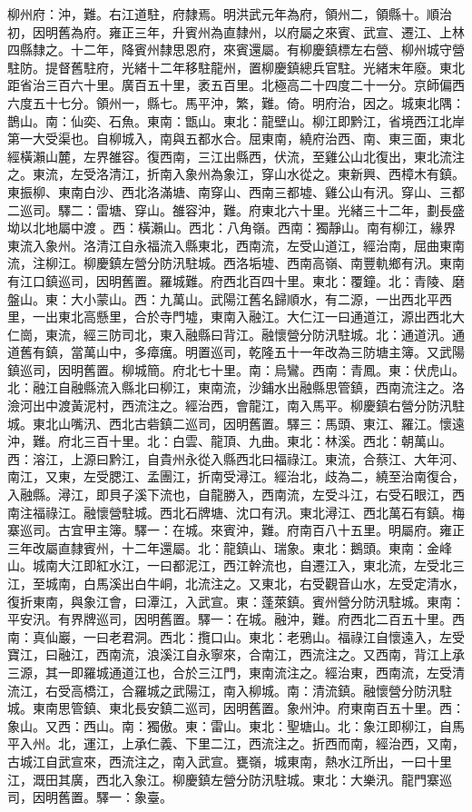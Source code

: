 \begin{pinyinscope}
柳州府：沖，難。右江道駐，府隸焉。明洪武元年為府，領州二，領縣十。順治初，因明舊為府。雍正三年，升賓州為直隸州，以府屬之來賓、武宣、遷江、上林四縣隸之。十二年，降賓州隸思恩府，來賓還屬。有柳慶鎮標左右營、柳州城守營駐防。提督舊駐府，光緒十二年移駐龍州，置柳慶鎮總兵官駐。光緒末年廢。東北距省治三百六十里。廣百五十里，袤五百里。北極高二十四度二十一分。京師偏西六度五十七分。領州一，縣七。馬平沖，繁，難。倚。明府治，因之。城東北隅：鵲山。南：仙奕、石魚。東南：甑山。東北：龍壁山。柳江即黔江，省境西江北岸第一大受渠也。自柳城入，南與五都水合。屈東南，繞府治西、南、東三面，東北經橫瀨山麓，左界雒容。復西南，三江出縣西，伏流，至雞公山北復出，東北流注之。東流，左受洛清江，折南入象州為象江，穿山水從之。東新興、西樟木有鎮。東振柳、東南白沙、西北洛滿塘、南穿山、西南三都墟、雞公山有汛。穿山、三都二巡司。驛二：雷塘、穿山。雒容沖，難。府東北六十里。光緒三十二年，劃長盛坳以北地屬中渡。西：橫瀨山。西北：八角嶺。西南：獨靜山。南有柳江，緣界東流入象州。洛清江自永福流入縣東北，西南流，左受山道江，經治南，屈曲東南流，注柳江。柳慶鎮左營分防汛駐城。西洛垢墟、西南高嶺、南豐軌鄉有汛。東南有江口鎮巡司，因明舊置。羅城難。府西北百四十里。東北：覆鐘。北：青陵、磨盤山。東：大小蒙山。西：九萬山。武陽江舊名歸順水，有二源，一出西北平西里，一出東北高懸里，合於寺門墟，東南入融江。大仁江一曰通道江，源出西北大仁崗，東流，經三防司北，東入融縣曰背江。融懷營分防汛駐城。北：通道汛。通道舊有鎮，當萬山中，多瘴癘。明置巡司，乾隆五十一年改為三防塘主簿。又武陽鎮巡司，因明舊置。柳城簡。府北七十里。南：烏鸞。西南：青鳳。東：伏虎山。北：融江自融縣流入縣北曰柳江，東南流，沙鋪水出融縣思管鎮，西南流注之。洛澰河出中渡黃泥村，西流注之。經治西，會龍江，南入馬平。柳慶鎮右營分防汛駐城。東北山嘴汛、西北古砦鎮二巡司，因明舊置。驛三：馬頭、東江、羅江。懷遠沖，難。府北三百十里。北：白雲、龍頂、九曲。東北：林溪。西北：朝萬山。西：溶江，上源曰黔江，自貴州永從入縣西北曰福祿江。東流，合蔡江、大年河、南江，又東，左受腮江、孟團江，折南受潯江。經治北，歧為二，繞至治南復合，入融縣。潯江，即貝子溪下流也，自龍勝入，西南流，左受斗江，右受石眼江，西南注福祿江。融懷營駐城。西北石牌塘、沈口有汛。東北潯江、西北萬石有鎮。梅寨巡司。古宜甲主簿。驛一：在城。來賓沖，難。府南百八十五里。明屬府。雍正三年改屬直隸賓州，十二年還屬。北：龍鎮山、瑞象。東北：鵝頭。東南：金峰山。城南大江即紅水江，一曰都泥江，西江幹流也，自遷江入，東北流，左受北三江，至城南，白馬溪出白牛峒，北流注之。又東北，右受觀音山水，左受定清水，復折東南，與象江會，曰潭江，入武宣。東：蓬萊鎮。賓州營分防汛駐城。東南：平安汛。有界牌巡司，因明舊置。驛一：在城。融沖，難。府西北二百五十里。西南：真仙巖，一曰老君洞。西北：攬口山。東北：老鴉山。福祿江自懷遠入，左受寶江，曰融江，西南流，浪溪江自永寧來，合南江，西流注之。又西南，背江上承三源，其一即羅城通道江也，合於三江門，東南流注之。經治東，西南流，左受清流江，右受高橋江，合羅城之武陽江，南入柳城。南：清流鎮。融懷營分防汛駐城。東南思管鎮、東北長安鎮二巡司，因明舊置。象州沖。府東南百五十里。西：象山。又西：西山。南：獨傲。東：雷山。東北：聖塘山。北：象江即柳江，自馬平入州。北，運江，上承仁義、下里二江，西流注之。折西而南，經治西，又南，古城江自武宣來，西流注之，南入武宣。甕嶺，城東南，熱水江所出，一曰十里江，溉田其廣，西北入象江。柳慶鎮左營分防汛駐城。東北：大樂汛。龍門寨巡司，因明舊置。驛一：象臺。


\end{pinyinscope}
